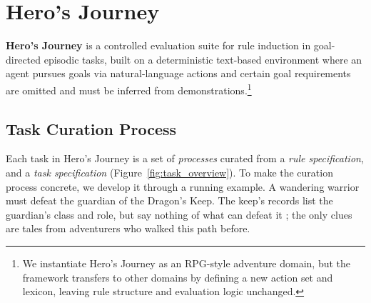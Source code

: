 \documentclass[11pt]{article}
\newcommand{\AS}{{\sc Hero's Journey}\xspace}
\newcommand\jl[1]{\todo[color=blue!40]{{\bf Jessy}: #1}}
\begin{document}
\section{\AS}
\label{AS}

\textbf{\AS} is a controlled evaluation suite for rule induction in goal-directed episodic tasks, built on a deterministic text-based environment where an agent pursues goals via natural-language actions and certain goal requirements are omitted and must be inferred from demonstrations.\footnote{We instantiate \AS as an RPG-style adventure domain, but the framework transfers to other domains by defining a new action set and lexicon, leaving rule structure and evaluation logic unchanged.}

\subsection{Task Curation Process}

Each task in \AS is a set of \textit{processes} curated from a \textit{rule specification}, and a \textit{task specification} (Figure~\ref{fig:task_overview}). To make the curation process concrete, we develop it through a running example. A wandering warrior must defeat the guardian of the Dragon's Keep. The keep's records list the guardian's class and role, but say nothing of what can defeat it%
; the only clues are tales from adventurers who walked this path before.
\end{document}
